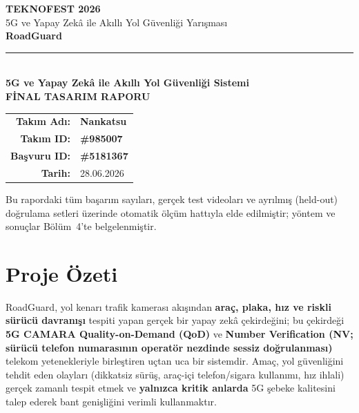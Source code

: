 \documentclass[12pt,a4paper]{article}
\begin{document}
\thispagestyle{empty}
\begin{center}
\vspace*{1.2cm}
{\fontsize{12}{14}\bfseries TEKNOFEST 2026}\\[2pt]
{\fontsize{12}{14}\selectfont 5G ve Yapay Zekâ ile Akıllı Yol Güvenliği Yarışması}\\[2.4cm]

{\fontsize{42}{46}\bfseries\color{rgmain} RoadGuard}\\[3pt]
{\color{rgmain}\rule{0.5\textwidth}{1.2pt}}\\[12pt]
{\fontsize{15}{19}\bfseries 5G ve Yapay Zekâ ile Akıllı Yol Güvenliği Sistemi}\\[16pt]
{\fontsize{17}{21}\bfseries\color{rgblue} FİNAL TASARIM RAPORU}\\[2.6cm]

\begin{tabular}{rl}
\textbf{Takım Adı:} & {\large\bfseries\color{rgmain}Nankatsu} \\[12pt]
\textbf{Takım ID:} & {\large\bfseries\color{rgmain}\#985007} \\[12pt]
\textbf{Başvuru ID:} & {\large\bfseries\color{rgmain}\#5181367} \\[12pt]
\textbf{Tarih:} & 28.06.2026 \\
\end{tabular}

\vfill
{\small Bu rapordaki tüm başarım sayıları, gerçek test videoları ve ayrılmış (held-out) doğrulama
setleri üzerinde otomatik ölçüm hattıyla elde edilmiştir; yöntem ve sonuçlar Bölüm~4'te belgelenmiştir.}
\end{center}
\newpage

\thispagestyle{empty}
\renewcommand{\contentsname}{İçindekiler}
\tableofcontents
\newpage

\section{Proje Özeti}
RoadGuard, yol kenarı trafik kamerası akışından \textbf{araç, plaka, hız ve riskli sürücü
davranışı} tespiti yapan gerçek bir yapay zekâ çekirdeğini; bu çekirdeği \textbf{5G CAMARA
Quality-on-Demand (QoD)} ve \textbf{Number Verification (NV; sürücü telefon numarasının
operatör nezdinde sessiz doğrulanması)} telekom yetenekleriyle birleştiren uçtan uca bir sistemdir. Amaç, yol güvenliğini tehdit eden olayları (dikkatsiz sürüş, araç-içi
telefon/sigara kullanımı, hız ihlali) gerçek zamanlı tespit etmek ve \textbf{yalnızca
kritik anlarda} 5G şebeke kalitesini talep ederek bant genişliğini verimli kullanmaktır.
\end{document}
